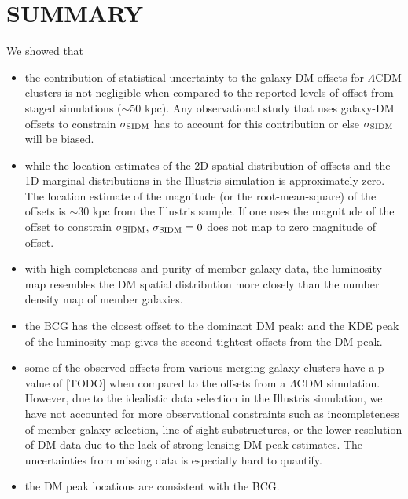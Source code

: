 \section{SUMMARY}
We showed that 
\begin{itemize}
		\item the contribution of statistical uncertainty to the galaxy-DM offsets 
			for $\Lambda$CDM clusters is not negligible when compared to the reported
			levels of offset from staged simulations ($\sim 50$ kpc). Any
			observational study that uses 
			galaxy-DM offsets to
			constrain $\sigma_{\rm SIDM}$ has to account for this contribution
			or else $\sigma_{\rm SIDM}$ will be biased. \\

		\item while the location estimates of the 2D spatial distribution of offsets and the
			1D marginal distributions in the Illustris simulation is approximately zero.
			The location estimate of the magnitude (or the root-mean-square) of the
			offsets is $\sim 30$ kpc from the Illustris sample. 
			If one uses the magnitude of the offset to constrain
			$\sigma_{\rm SIDM}$, $\sigma_{\rm SIDM} = 0$ 
			does not map to zero magnitude of offset.  \\

		\item with high completeness and purity of member galaxy data, the
			luminosity map resembles the DM spatial distribution more closely than 
			the number density map of member galaxies. \\ 

		\item the BCG has the closest offset to the dominant DM peak; and  
			the KDE peak of the luminosity map gives the second tightest 
			offsets from the DM peak. \\

		\item some of the observed offsets from various merging galaxy clusters 
			have a p-value of [TODO]  when compared to the offsets from a  
			$\Lambda$CDM simulation. However, due to the idealistic data selection
			in the Illustris simulation, we have not accounted for more
			observational constraints such as incompleteness of member galaxy 
			selection, 
			line-of-sight substructures, or the lower resolution of DM data due to the
			lack of strong lensing DM peak estimates. The uncertainties from missing
			data is especially hard to quantify. \\

		\item the DM peak locations are consistent with the BCG.  \\


\end{itemize}


